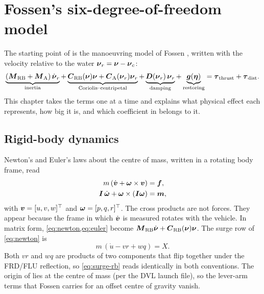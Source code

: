 \chapter{Fossen's six-degree-of-freedom model}
\label{ch:fossen}

The starting point of  is the manoeuvring model of Fossen
\cite[ch.~6--7]{fossen2011}, written with the velocity relative to the water
$\boldsymbol{\nu}_r = \boldsymbol{\nu} - \boldsymbol{\nu}_c$:
\begin{equation}
  \underbrace{(\boldsymbol{M}_\mathrm{RB} + \boldsymbol{M}_\mathrm{A})\,\dot{\boldsymbol{\nu}}_r}_{\text{inertia}}
  + \underbrace{\boldsymbol{C}_\mathrm{RB}(\boldsymbol{\nu})\boldsymbol{\nu} + \boldsymbol{C}_\mathrm{A}(\boldsymbol{\nu}_r)\boldsymbol{\nu}_r}_{\text{Coriolis--centripetal}}
  + \underbrace{\boldsymbol{D}(\boldsymbol{\nu}_r)\,\boldsymbol{\nu}_r}_{\text{damping}}
  + \underbrace{\boldsymbol{g}(\boldsymbol{\eta})}_{\text{restoring}}
  = \boldsymbol{\tau}_\mathrm{thrust} + \boldsymbol{\tau}_\mathrm{dist}.
  \label{eq:fossen}
\end{equation}
This chapter takes the terms one at a time and explains what physical effect each
represents, how big it is, and which coefficient in  belongs to it.

\section{Rigid-body dynamics}

Newton's and Euler's laws about the centre of mass, written in a rotating body frame, read
\begin{align}
  m\,(\dot{\boldsymbol{v}} + \boldsymbol{\omega}\times\boldsymbol{v}) &= \boldsymbol{f}, \label{eq:newton}\\
  \boldsymbol{I}\,\dot{\boldsymbol{\omega}} + \boldsymbol{\omega}\times(\boldsymbol{I}\boldsymbol{\omega}) &= \boldsymbol{m}, \label{eq:euler}
\end{align}
with $\boldsymbol{v} = [u,v,w]^\top$ and $\boldsymbol{\omega} = [p,q,r]^\top$. The cross products are
not forces. They appear because the frame in which $\dot{\boldsymbol{v}}$ is measured rotates
with the vehicle. In matrix form, \cref{eq:newton,eq:euler} become
$\boldsymbol{M}_\mathrm{RB}\dot{\boldsymbol{\nu}} + \boldsymbol{C}_\mathrm{RB}(\boldsymbol{\nu})\boldsymbol{\nu}$. The surge
row of \eqref{eq:newton} is
\begin{equation}
  m\,(\dot u - v r + w q) = X .
  \label{eq:surge-rb}
\end{equation}
Both $v r$ and $w q$ are products of two components that flip together under the FRD/FLU
reflection, so \eqref{eq:surge-rb} reads identically in both conventions. The origin of
 lies at the centre of mass (per the DVL launch file), so the lever-arm terms
that Fossen carries for an offset centre of gravity vanish.

